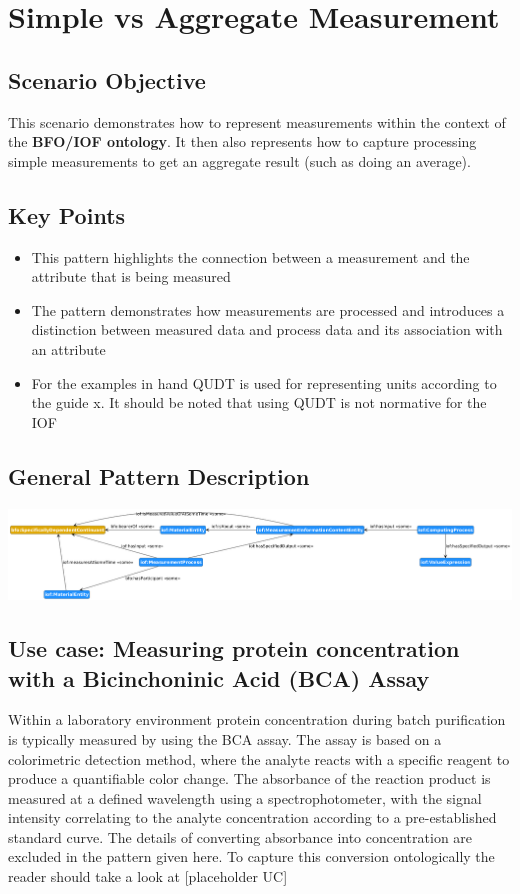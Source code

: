 \section{Simple vs Aggregate Measurement}
\subsection*{Scenario Objective}


This scenario demonstrates how to represent measurements within the context of the \textbf{BFO/IOF ontology}. It then also represents how to capture processing simple measurements to get an aggregate result (such as doing an average). 

\subsection*{Key Points}
\begin{itemize}
    \item This pattern highlights the connection between a measurement and the attribute that is being measured
    \item The pattern demonstrates how measurements are processed and introduces a distinction between measured data and process data and its association with an attribute
    \item For the examples in hand QUDT is used for representing units according to the guide x. It should be noted that using QUDT is not normative for the IOF
\end{itemize}

\subsection*{General Pattern Description}
\includegraphics[scale=0.3]{scenarios/measurements/image/measurement_aggregate_general.png}

\subsection{Use case: Measuring protein concentration with a  Bicinchoninic Acid (BCA) Assay}
Within a laboratory environment protein concentration during batch purification is typically measured by using the BCA assay. The assay is based on a colorimetric detection method, where the analyte reacts with a specific reagent to produce a quantifiable color change. The absorbance of the reaction product is measured at a defined wavelength using a spectrophotometer, with the signal intensity correlating to the analyte concentration according to a pre-established standard curve.  The details of converting absorbance into concentration are excluded in the pattern given here. To capture this conversion ontologically the reader should take a look at [placeholder UC] 

